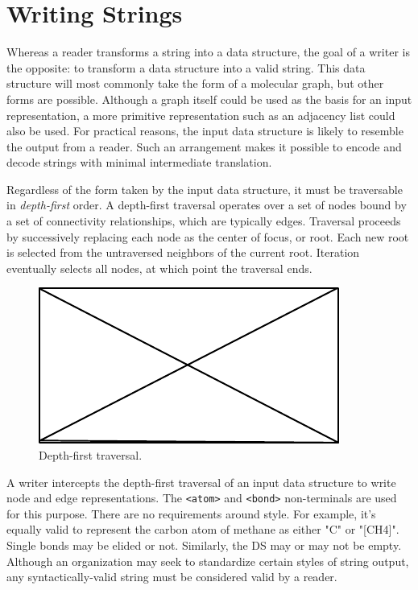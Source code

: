 \documentclass{article}
\def\ttt{\texttt}
\begin{document}
\section*{Writing Strings}

Whereas a reader transforms a string into a data structure, the goal of a writer is the opposite: to transform a data structure into a valid string. This data structure will most commonly take the form of a molecular graph, but other forms are possible. Although a graph itself could be used as the basis for an input representation, a more primitive representation such as an adjacency list could also be used. For practical reasons, the input data structure is likely to resemble the output from a reader. Such an arrangement makes it possible to encode and decode strings with minimal intermediate translation.

Regardless of the form taken by the input data structure, it must be traversable in \textit{depth-first} order. A depth-first traversal operates over a set of nodes bound by a set of connectivity relationships, which are typically edges. Traversal proceeds by successively replacing each node as the center of focus, or root. Each new root is selected from the untraversed neighbors of the current root. Iteration eventually selects all nodes, at which point the traversal ends.

\begin{figure}
    \centering
    \includegraphics{filler}
    \caption{Depth-first traversal.}
    \label{fig:depth-first-traversal}
\end{figure}

A writer intercepts the depth-first traversal of an input data structure to write node and edge representations. The \ttt{<atom>} and \ttt{<bond>} non-terminals are used for this purpose. There are no requirements around style. For example, it's equally valid to represent the carbon atom of methane as either "C" or "[CH4]". Single bonds may be elided or not. Similarly, the DS may or may not be empty. Although an organization may seek to standardize certain styles of string output, any syntactically-valid string must be considered valid by a reader.
\end{document}

